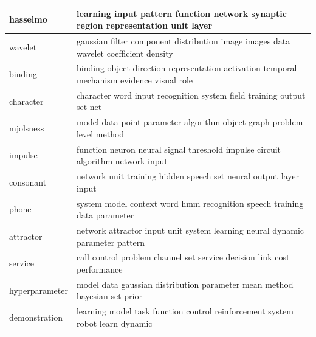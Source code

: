 \documentclass{article}
\begin{document}
\begin{tabular}{ l | l }
    hasselmo & learning input pattern function network synaptic region representation unit layer \\ \hline 
    wavelet & gaussian filter component distribution image images data wavelet coefficient density \\ \hline 
    binding & binding object direction representation activation temporal mechanism evidence visual role \\ \hline 
    character & character word input recognition system field training output set net \\ \hline 
    mjolsness & model data point parameter algorithm object graph problem level method \\ \hline 
    impulse & function neuron neural signal threshold impulse circuit algorithm network input \\ \hline 
    consonant & network unit training hidden speech set neural output layer input \\ \hline 
    phone & system model context word hmm recognition speech training data parameter \\ \hline 
    attractor & network attractor input unit system learning neural dynamic parameter pattern \\ \hline 
    service & call control problem channel set service decision link cost performance \\ \hline 
    hyperparameter & model data gaussian distribution parameter mean method bayesian set prior \\ \hline 
    demonstration & learning model task function control reinforcement system robot learn dynamic \\ \hline 

  \end{tabular}
\end{document}

